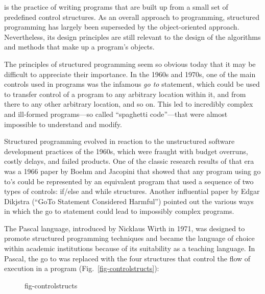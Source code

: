 

 is the practice of writing programs that
are built up from a small set of predefined control structures. As an
overall approach to programming, structured programming has largely
been superseded by the object-oriented approach. Nevertheless, its
design principles are still relevant to the design of the
algorithms and methods that make up a program's objects.

The principles of structured programming seem so obvious today that it
may be difficult to appreciate their importance. In the 1960s and 1970s,
one of the main controls used in programs was the infamous
{\it go to} statement, which could be used to transfer
control of a program to any arbitrary location within it, and
from there to any other arbitrary location, and so on. This led to
incredibly complex and ill-formed programs---so called ``spaghetti
code''---that were almost impossible to understand and modify.

Structured programming evolved in reaction to the unstructured
software development practices of the 1960s, which were fraught with
budget overruns, costly delays, and failed products. One of the classic
research results of that era was a 1966 paper by Boehm and
Jacopini that showed that any program using go to's
could be represented by an equivalent program that used a sequence of
two types of controls: if/else and while structures. Another
influential paper by Edgar Dikjstra (``GoTo Statement
Considered Harmful'') pointed out the various ways in which the go to statement
could lead to impossibly complex programs.

The Pascal language, introduced by Nicklaus Wirth in 1971, was
designed to promote structured programming techniques and became the
language of choice within academic institutions because of its
suitability as a teaching language. In Pascal, the go to was replaced
with the four structures that control the flow of execution
in a program (Fig.~\ref{fig-controlstructs}):


\begin{figure}[hbt]
{fig-controlstructs}

\end{figure}

